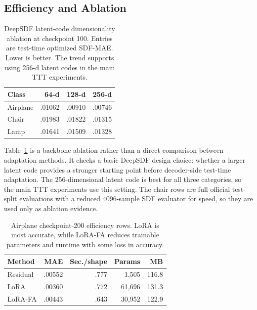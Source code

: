 \documentclass[letterpaper]{article}
\begin{document}
\subsection{Efficiency and Ablation}

\begin{table}[t]
\centering
\begin{small}
\begin{tabular}{lrrr}
\hline
Class & 64-d & 128-d & 256-d \\
\hline
Airplane & .01062 & .00910 & .00746 \\
Chair & .01983 & .01822 & .01315 \\
Lamp & .01641 & .01509 & .01328 \\
\hline
\end{tabular}
\end{small}
\caption{DeepSDF latent-code dimensionality ablation at checkpoint 100. Entries are test-time optimized SDF-MAE. Lower is better. The trend supports using 256-d latent codes in the main TTT experiments.}
\label{tab:latent}
\end{table}

Table~\ref{tab:latent} is a backbone ablation rather than a direct comparison between adaptation methods. It checks a basic DeepSDF design choice: whether a larger latent code provides a stronger starting point before decoder-side test-time adaptation. The 256-dimensional latent code is best for all three categories, so the main TTT experiments use this setting. The chair rows are full official test-split evaluations with a reduced 4096-sample SDF evaluator for speed, so they are used only as ablation evidence.

\begin{table}[t]
\centering
\begin{small}
\begin{tabular}{lrrrr}
\hline
Method & MAE & Sec./shape & Params & MB \\
\hline
Residual & .00552 & .777 & 1,505 & 116.8 \\
LoRA & .00360 & .772 & 61,696 & 131.3 \\
LoRA-FA & .00443 & .643 & 30,952 & 122.9 \\
\hline
\end{tabular}
\end{small}
\caption{Airplane checkpoint-200 efficiency rows. LoRA is most accurate, while LoRA-FA reduces trainable parameters and runtime with some loss in accuracy.}
\label{tab:eff}
\end{table}
\end{document}
